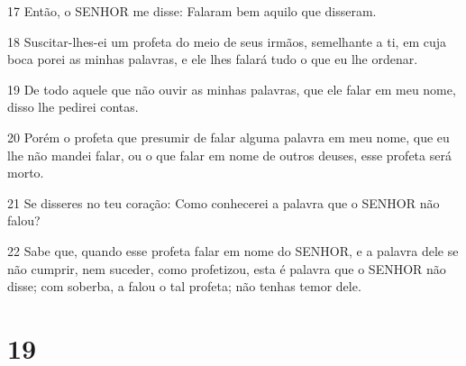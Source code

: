 \par 17 Então, o SENHOR me disse: Falaram bem aquilo que disseram.
\par 18 Suscitar-lhes-ei um profeta do meio de seus irmãos, semelhante a ti, em cuja boca porei as minhas palavras, e ele lhes falará tudo o que eu lhe ordenar.
\par 19 De todo aquele que não ouvir as minhas palavras, que ele falar em meu nome, disso lhe pedirei contas.
\par 20 Porém o profeta que presumir de falar alguma palavra em meu nome, que eu lhe não mandei falar, ou o que falar em nome de outros deuses, esse profeta será morto.
\par 21 Se disseres no teu coração: Como conhecerei a palavra que o SENHOR não falou?
\par 22 Sabe que, quando esse profeta falar em nome do SENHOR, e a palavra dele se não cumprir, nem suceder, como profetizou, esta é palavra que o SENHOR não disse; com soberba, a falou o tal profeta; não tenhas temor dele.

\chapter{19}

